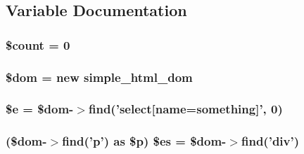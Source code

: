 \subsection{Variable Documentation}
\hypertarget{reader_2element__testcase_8php_af789423037bbc89dc7c850e761177570}{
\subsubsection[{\$count}]{\setlength{\rightskip}{0pt plus 5cm}\$count = 0}}\label{reader_2element__testcase_8php_af789423037bbc89dc7c850e761177570}
\hypertarget{reader_2element__testcase_8php_a46127a794280dd592812c25b62af34b0}{
\subsubsection[{\$dom}]{\setlength{\rightskip}{0pt plus 5cm}\$dom = new {\bf simple\+\_\+html\+\_\+dom}}}\label{reader_2element__testcase_8php_a46127a794280dd592812c25b62af34b0}
\hypertarget{reader_2element__testcase_8php_ab74076a9b7e1d23d12b9e8d65e60315a}{
\subsubsection[{\$e}]{\setlength{\rightskip}{0pt plus 5cm}\$e = \$dom-\/$>$find('select\mbox{[}{\bf name}=something\mbox{]}', 0)}}\label{reader_2element__testcase_8php_ab74076a9b7e1d23d12b9e8d65e60315a}
\hypertarget{reader_2element__testcase_8php_a3b7fe8df18180e15ae677b41b1507990}{
\subsubsection[{\$es}]{ (\$dom-\/$>$find('p') as \$p) \$es = \$dom-\/$>$find('div')}}\label{reader_2element__testcase_8php_a3b7fe8df18180e15ae677b41b1507990}
